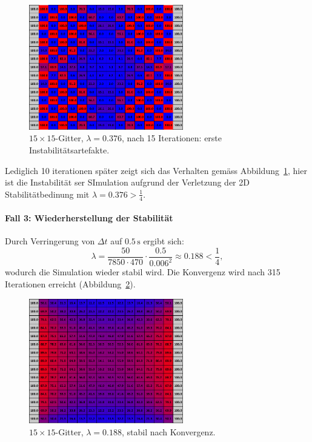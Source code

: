 \begin{figure}[htbp]
	\centering
	\includegraphics[width=0.6\textwidth]{papers/parallelisierung/images/simulation_15x15_0.376_15it.pdf}
	\caption{\(15\times 15\)-Gitter, \(\lambda = 0.376\), nach 15 Iterationen: erste Instabilitätsartefakte.}
	\label{parallelisierung:fig:simulation_15x15_0.376_15it}
\end{figure}

Lediglich 10 iterationen später zeigt sich das Verhalten gemäss Abbildung~\ref{parallelisierung:fig:simulation_15x15_0.376_15it}, hier ist die Instabilität ser SImulation aufgrund der Verletzung der 2D Stabilitätbedinung mit \(\lambda = 0.376 > \frac{1}{4}\).

\paragraph{Fall 3: Wiederherstellung der Stabilität}  
Durch Verringerung von \(\Delta t\) auf \(0.5\,\mathrm{s}\) ergibt sich:
\[
\lambda =
\frac{50}{7850 \cdot 470} \cdot \frac{0.5}{0.006^2}
\approx 0.188 < \frac14,
\]
wodurch die Simulation wieder stabil wird. Die Konvergenz wird nach 315 Iterationen erreicht (Abbildung~\ref{parallelisierung:fig:simulation_15x15_0.188_konv}).

\begin{figure}[htbp]
	\centering
	\includegraphics[width=0.6\textwidth]{papers/parallelisierung/images/simulation_15x15_0.188_konv.pdf}
	\caption{\(15\times 15\)-Gitter, \(\lambda = 0.188\), stabil nach Konvergenz.}
	\label{parallelisierung:fig:simulation_15x15_0.188_konv}
\end{figure}


